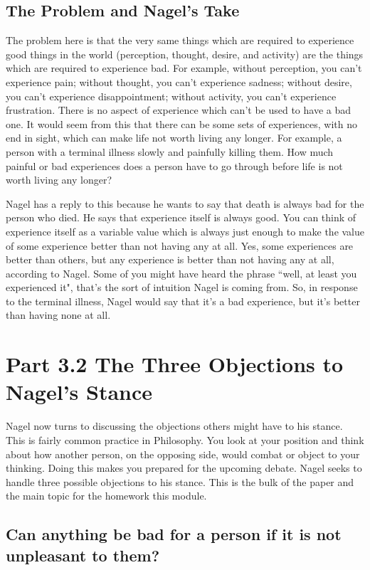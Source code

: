 \subsection{The Problem and Nagel's Take}
The problem here is that the very same things which are required to experience good things in the world (perception, thought, desire, and activity) are the things which are required to experience bad. For example, without perception, you can't experience pain; without thought, you can't experience sadness; without desire, you can't experience disappointment; without activity, you can't experience frustration. There is no aspect of experience which can't be used to have a bad one. It would seem from this that there can be some sets of experiences, with no end in sight, which can make life not worth living any longer. For example, a person with a terminal illness slowly and painfully killing them. How much painful or bad experiences does a person have to go through before life is not worth living any longer?

Nagel has a reply to this because he wants to say that death is always bad for the person who died. He says that experience itself is always good. You can think of experience itself as a variable value which is always just enough to make the value of some experience better than not having any at all. Yes, some experiences are better than others, but any experience is better than not having any at all, according to Nagel. Some of you might have heard the phrase ``well, at least you experienced it", that's the sort of intuition Nagel is coming from. So, in response to the terminal illness, Nagel would say that it's a bad experience, but it's better than having none at all.  

\section{Part 3.2 The Three Objections to Nagel's Stance}
Nagel now turns to discussing the objections others might have to his stance. This is fairly common practice in Philosophy. You look at your position and think about how another person, on the opposing side, would combat or object to your thinking. Doing this makes you prepared for the upcoming debate. Nagel seeks to handle three possible objections to his stance. This is the bulk of the paper and the main topic for the homework this module.

\subsection{Can anything be bad for a person if it is not unpleasant to them?}


